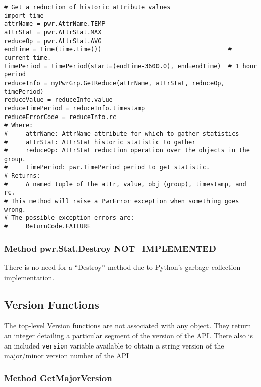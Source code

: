 \begin{center}\begin{minipage}{.95\linewidth}\begin{lstlisting}
# Get a reduction of historic attribute values
import time
attrName = pwr.AttrName.TEMP
attrStat = pwr.AttrStat.MAX
reduceOp = pwr.AttrStat.AVG
endTime = Time(time.time())                                   # current time.
timePeriod = timePeriod(start=(endTime-3600.0), end=endTime)  # 1 hour period
reduceInfo = myPwrGrp.GetReduce(attrName, attrStat, reduceOp, timePeriod)
reduceValue = reduceInfo.value
reduceTimePeriod = reduceInfo.timestamp
reduceErrorCode = reduceInfo.rc
# Where:
#     attrName: AttrName attribute for which to gather statistics
#     attrStat: AttrStat historic statistic to gather
#     reduceOp: AttrStat reduction operation over the objects in the group.
#     timePeriod: pwr.TimePeriod period to get statistic.
# Returns:
#     A named tuple of the attr, value, obj (group), timestamp, and rc.
# This method will raise a PwrError exception when something goes wrong.
# The possible exception errors are:
#     ReturnCode.FAILURE
\end{lstlisting}\end{minipage}\end{center}


\subsubsection{Method pwr.Stat.Destroy NOT_IMPLEMENTED}
\label{meth:StatDestroy}

There is no need for a ``Destroy'' method due to Python's garbage collection implementation.

\subsection{Version Functions} \label{sec:PythonVersionFunctions}
The top-level Version functions are not associated with any object. They return
an integer detailing a particular segment of the version of the API. There also
is an included \texttt{version} variable available to obtain a string version of the
major/minor version number of the API

\subsubsection{Method GetMajorVersion} \label{meth:GetMajorVersion}

